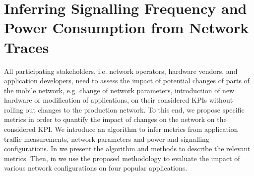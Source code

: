 \section{Inferring Signalling Frequency and Power Consumption from Network Traces}\label{sec:network:network_traces}
All participating stakeholders, i.e. network operators, hardware vendors, and application developers, need to assess the impact of potential changes of parts of the mobile network, e.g. change of network parameters, introduction of new hardware or modification of applications, on their considered \glspl{KPI} without rolling out changes to the production network.
To this end, we propose specific metrics in order to quantify the impact of changes on the network on the considered \gls{KPI}.
We introduce an algorithm to infer metrics from application traffic measurements, network parameters and power and signalling configurations.
In  we present the algorithm and methods to describe the relevant metrics.
Then, in  we use the proposed methodology to evaluate the impact of various network configurations on four popular applications.



